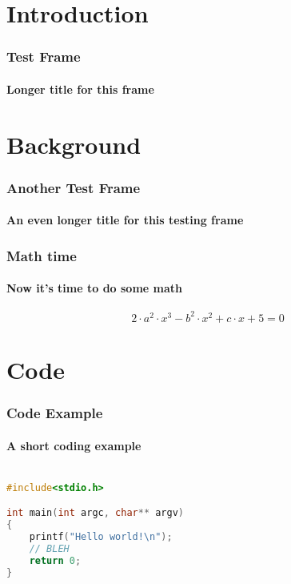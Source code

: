 



\section{Introduction}

\begin{frame}[label=TESTFRAME]
\frametitle{Test Frame}
\framesubtitle{Longer title for this frame}

\lipsum[4]

\end{frame}



\section{Background}

\begin{frame}[label=TESTFRAME2]
\frametitle{Another Test Frame}
\framesubtitle{An even longer title for this testing frame}

\lipsum[4]

\end{frame}


\begin{frame}[label=MATHFRAME]
\frametitle{Math time}
\framesubtitle{Now it's time to do some math}

\lipsum[2]

\begin{equation}
2 \cdot a^{2} \cdot x^{3} - b^{2} \cdot x^{2} + c \cdot x + 5 = 0
\end{equation}


\end{frame}




\section{Code}

\begin{frame}[fragile,label=CODEFRAME]
\frametitle{Code Example}
\framesubtitle{A short coding example}

\begin{lstlisting}[language=C,basicstyle=\ttfamily]

#include<stdio.h>

int main(int argc, char** argv)
{
    printf("Hello world!\n");
    // BLEH
    return 0;
}

\end{lstlisting}

\end{frame}
